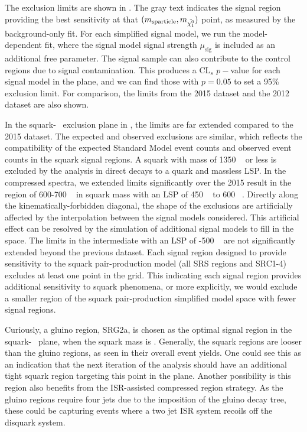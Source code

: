 The exclusion limits are shown in .
The gray text indicates the signal region providing the best sensitivity at that $(m_{\mathrm{sparticle}}, m_{\tilde{\chi^0_1}})$ point, as measured by the background-only fit.
For each simplified signal model, we run the model-dependent fit, where the signal model signal strength $\mu_{\mathrm{sig}}$ is included as an additional free parameter.
The signal sample can also contribute to the control regions due to signal contamination.
This produces a CL$_s$ $p-$value for each signal model in the plane, and we can find those with $p = 0.05$ to set a 95\% exclusion limit.
For comparison, the limits from the 2015 dataset and the 2012 dataset are also shown.

In the squark-\lsp~ exclusion plane in , the limits are far extended compared to the 2015 dataset.
The expected and observed exclusions are similar, which reflects the compatibility of the expected Standard Model event counts and observed event counts in the squark signal regions.
A squark with mass of 1350 \GeV~ or less is excluded by the analysis in direct decays to a quark and massless LSP.
In the compressed spectra, we extended limits significantly over the 2015 result in the region of 600-700 \GeV~ in squark mass with an LSP of 450 \GeV~ to 600 \GeV~.
Directly along the kinematically-forbidden diagonal, the shape of the exclusions are artificially affected by the interpolation between the signal models considered.
This artificial effect can be resolved by the simulation of additional signal models to fill in the space.
The limits in the intermediate with an LSP of -500 \GeV~ are not significantly extended beyond the previous dataset.
Each signal region designed to provide sensitivity to the squark pair-production model (all SRS regions and SRC1-4) excludes at least one point in the grid.
This indicating each signal region provides additional sensitivity to squark phenomena, or more explicitly, we would exclude a smaller region of the squark pair-production simplified model space with fewer signal regions.

Curiously, a gluino region, SRG2a, is chosen as the optimal signal region in the squark-\lsp~ plane, when the squark mass is  \GeV.
Generally, the squark regions are looser than the gluino regions, as seen in their overall event yields.
One could see this as an indication that the next iteration of the analysis should have an additional tight squark region targeting this point in the plane.
Another possibility is this region also benefits from the ISR-assisted compressed region strategy.
As the gluino regions require four jets due to the imposition of the gluino decay tree, these could be capturing events where a two jet ISR system recoils off the disquark system.

